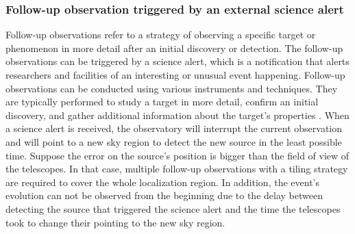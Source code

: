 \subsubsection{Follow-up observation triggered by an external science alert}
\label{s:follow-up-observation}
Follow-up observations refer to a strategy of observing a specific target or phenomenon in more detail after an initial discovery or detection. The follow-up observations can be triggered by a science alert, which is a notification that alerts researchers and facilities of an interesting or unusual event happening. Follow-up observations can be conducted using various instruments and techniques. They are typically performed to study a target in more detail, confirm an initial discovery, and gather additional information about the target's properties \cite{ScienceWithCherenkovTelescopeArray2018}. When a science alert is received, the observatory will interrupt the current observation and will point to a new sky region to detect the new source in the least possible time. Suppose the error on the source's position is bigger than the field of view of the telescopes. In that case, multiple follow-up observations with a tiling strategy \cite{bulgarelli2015on} are required to cover the whole localization region. In addition, the event's evolution can not be observed from the beginning due to the delay between detecting the source that triggered the science alert and the time the telescopes took to change their pointing to the new sky region. 


